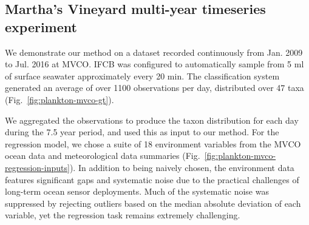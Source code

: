 \subsection{Martha's Vineyard multi-year timeseries experiment}
We demonstrate our method on a dataset recorded continuously from Jan. 2009 to Jul. 2016 at MVCO. IFCB was configured to automatically sample from 5 ml of surface seawater approximately every 20 min. The classification system generated an average of over 1100 observations per day, distributed over 47 taxa (Fig.~\ref{fig:plankton-mvco-gt}).

We aggregated the observations to produce the taxon distribution for each day during the 7.5 year period, and used this as input to our method. For the regression model, we chose a suite of 18 environment variables from the MVCO ocean data and meteorological data summaries (Fig.~\ref{fig:plankton-mvco-regression-inputs}). In addition to being naively chosen, the environment data features significant gaps and systematic noise due to the practical challenges of long-term ocean sensor deployments. Much of the systematic noise was suppressed by rejecting outliers based on the median absolute deviation of each variable, yet the regression task remains extremely challenging.

